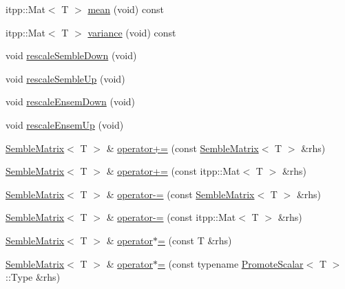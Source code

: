\begin{DoxyCompactItemize}
\item 
itpp\+::\+Mat$<$ T $>$ \mbox{\hyperlink{structSEMBLE_1_1SembleMatrix_a53a5289f03357a50c6504282100e4237}{mean}} (void) const
\item 
itpp\+::\+Mat$<$ T $>$ \mbox{\hyperlink{structSEMBLE_1_1SembleMatrix_a62af996687fe0bd0444fc4360b1b651f}{variance}} (void) const
\item 
void \mbox{\hyperlink{structSEMBLE_1_1SembleMatrix_a4d2124fd0ca69d6e0759080eb4aec67b}{rescale\+Semble\+Down}} (void)
\item 
void \mbox{\hyperlink{structSEMBLE_1_1SembleMatrix_a7015574fba80f7dbabb0501567c5b58c}{rescale\+Semble\+Up}} (void)
\item 
void \mbox{\hyperlink{structSEMBLE_1_1SembleMatrix_a8073a3547ac8aa58aa4c76a11328d776}{rescale\+Ensem\+Down}} (void)
\item 
void \mbox{\hyperlink{structSEMBLE_1_1SembleMatrix_a6c6da8677941f6422d30c582f6fd87c0}{rescale\+Ensem\+Up}} (void)
\item 
\mbox{\hyperlink{structSEMBLE_1_1SembleMatrix}{Semble\+Matrix}}$<$ T $>$ \& \mbox{\hyperlink{structSEMBLE_1_1SembleMatrix_a5936a2f5446365cd0eafb0ede754d392}{operator+=}} (const \mbox{\hyperlink{structSEMBLE_1_1SembleMatrix}{Semble\+Matrix}}$<$ T $>$ \&rhs)
\item 
\mbox{\hyperlink{structSEMBLE_1_1SembleMatrix}{Semble\+Matrix}}$<$ T $>$ \& \mbox{\hyperlink{structSEMBLE_1_1SembleMatrix_a0196369ecba26c3cf14d9741d49de9d0}{operator+=}} (const itpp\+::\+Mat$<$ T $>$ \&rhs)
\item 
\mbox{\hyperlink{structSEMBLE_1_1SembleMatrix}{Semble\+Matrix}}$<$ T $>$ \& \mbox{\hyperlink{structSEMBLE_1_1SembleMatrix_a61af6d42338efa84f4ed2456c4799445}{operator-\/=}} (const \mbox{\hyperlink{structSEMBLE_1_1SembleMatrix}{Semble\+Matrix}}$<$ T $>$ \&rhs)
\item 
\mbox{\hyperlink{structSEMBLE_1_1SembleMatrix}{Semble\+Matrix}}$<$ T $>$ \& \mbox{\hyperlink{structSEMBLE_1_1SembleMatrix_a327dbea8055acd490fb9848a512f7581}{operator-\/=}} (const itpp\+::\+Mat$<$ T $>$ \&rhs)
\item 
\mbox{\hyperlink{structSEMBLE_1_1SembleMatrix}{Semble\+Matrix}}$<$ T $>$ \& \mbox{\hyperlink{structSEMBLE_1_1SembleMatrix_ac14d8431e3f54854981c8a2355cbcc5b}{operator$\ast$=}} (const T \&rhs)
\item 
\mbox{\hyperlink{structSEMBLE_1_1SembleMatrix}{Semble\+Matrix}}$<$ T $>$ \& \mbox{\hyperlink{structSEMBLE_1_1SembleMatrix_a9da9280a327b75bb2a7d58080ef6aa59}{operator$\ast$=}} (const typename \mbox{\hyperlink{structSEMBLE_1_1PromoteScalar}{Promote\+Scalar}}$<$ T $>$\+::Type \&rhs)

\end{DoxyCompactItemize}
